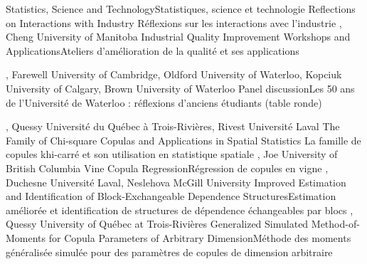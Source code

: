 {
}
{Statistics, Science and Technology}{Statistiques, science et technologie}
{\bubbleE \enspace \screenE}
{
}
{Reflections on Interactions with Industry }{Réflexions sur les interactions avec l’industrie}
{\bubbleE \enspace \screenE}
{
,  {Cheng}
{University of Manitoba}
}
{Industrial Quality Improvement Workshops and Applications}{Ateliers d’amélioration de la qualité et ses applications}
{\bubbleE \enspace \screenE}


{
,  {Farewell}
{University of Cambridge},  {Oldford}
{University of Waterloo},  {Kopciuk}
{University of Calgary},  {Brown}
{University of Waterloo}
}
{Panel discussion}{Les 50 ans de l'Université de Waterloo : réflexions d’anciens étudiants (table ronde) }
{\bubbleE \enspace \screenE}


{
,  {Quessy}
{Université du Québec à Trois-Rivières},  {Rivest}
{Université Laval}
}
{The Family of Chi-square Copulas and Applications in Spatial Statistics }{La famille de copules khi-carré et son utilisation en statistique spatiale}
{\bubbleF \enspace \screenE}
{
,  {Joe}
{University of British Columbia}
}
{Vine Copula Regression}{Régression de copules en vigne}
{\bubbleE \enspace \screenE}
{
,  {Duchesne}
{Université Laval},  {Neslehova}
{McGill University}
}
{Improved Estimation and Identification of Block-Exchangeable Dependence Structures}{Estimation améliorée et identification de structures de dépendence échangeables par blocs}
{\bubbleE \enspace \screenE}
{
,  {Quessy}
{University of Québec at Trois-Rivières}
}
{Generalized Simulated Method-of-Moments for Copula Parameters of Arbitrary Dimension}{Méthode des moments généralisée simulée pour des paramètres de copules de dimension arbitraire}
{\bubbleE \enspace \screenE}

